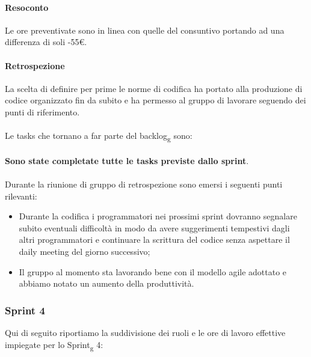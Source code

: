 \paragraph{Resoconto}
Le ore preventivate sono in linea con quelle del consuntivo portando ad una differenza di soli -55\euro.

\paragraph{Retrospezione}
La scelta di definire per prime le norme di codifica ha portato alla produzione di codice organizzato fin da subito e ha permesso al gruppo di lavorare seguendo dei punti di 
riferimento.
\\\\
Le tasks che tornano a far parte del backlog\textsubscript{g} sono:
\\\\
\textbf{Sono state completate tutte le tasks previste dallo sprint}.
\\\\
\noindent Durante la riunione di gruppo di retrospezione sono emersi i seguenti punti rilevanti:
\begin{itemize}
	\item Durante la codifica i programmatori nei prossimi sprint dovranno segnalare subito eventuali difficoltà in modo da avere suggerimenti tempestivi dagli altri 
	programmatori e continuare la scrittura del codice senza aspettare il daily meeting del giorno successivo;
	\item Il gruppo al momento sta lavorando bene con il modello agile adottato e abbiamo notato un aumento della produttività.
\end{itemize}
\pagebreak


\subsubsection{Sprint 4}
Qui di seguito riportiamo la suddivisione dei ruoli e le ore di lavoro effettive impiegate per lo Sprint\textsubscript{g} 4:

